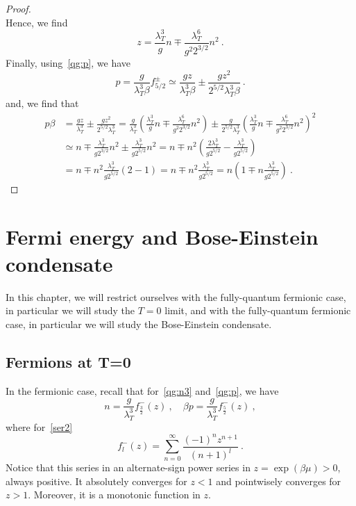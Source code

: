 \begin{proof}
\begin{equation*}
        \end{equation*}
        Hence, we find 
        \begin{equation*}
            z = \frac{\lambda_T^3}{g} n \mp \frac{\lambda_T^6}{g^2 2^{3/2}} n^2 ~.
        \end{equation*}
        Finally, using~\eqref{qg:p}, we have
        \begin{equation*}
            p = \frac{g}{\lambda_T^3 \beta} f^\pm_{5/2} \simeq \frac{gz}{\lambda_T^3\beta} \pm \frac{g z^2}{2^{5/2} \lambda_T^3 \beta} ~.
        \end{equation*}
        and, we find that
        \begin{equation*}
        \begin{aligned}
            p \beta &= \frac{gz}{\lambda_T^3} \pm \frac{g z^2}{2^{5/2} \lambda_T^3}  = \frac{g}{\lambda_T^3} (\frac{\lambda_T^3}{g} n \mp \frac{\lambda_T^6}{g^2 2^{3/2}} n^2) \pm \frac{g}{2^{5/2} \lambda_T^3} (\frac{\lambda_T^3}{g} n \mp \frac{\lambda_T^6}{g^2 2^{3/2}} n^2)^2 \\ & \simeq n \mp \frac{\lambda^3_T}{g 2^{3/2}} n^2 \pm \frac{\lambda^3_T}{g 2^{5/2}} n^2 = n \mp n^2 (\frac{2\lambda^3_T}{g 2^{5/2}} - \frac{\lambda^3_T}{g 2^{5/2}} ) \\ & = n \mp n^2 \frac{\lambda^3_T}{g 2^{5/2}}(2 - 1) = n \mp n^2 \frac{\lambda^3_T}{g 2^{5/2}} = n ( 1 \mp n \frac{\lambda_T^3}{g 2^{5/2}} ) ~.
        \end{aligned}
        \end{equation*}
    \end{proof}

\chapter{Fermi energy and Bose-Einstein condensate}

    In this chapter, we will restrict ourselves with the fully-quantum fermionic case, in particular we will study the $T = 0$ limit, and with the fully-quantum fermionic case, in particular we will study the Bose-Einstein condensate.

\section{Fermions at T=0}

    In the fermionic case, recall that for~\eqref{qg:n3} and~\eqref{qg:p}, we have
    \begin{equation*}
        n = \frac{g}{\lambda_T^3} f_{\frac{3}{2}}^- (z) ~, \quad \beta p = \frac{g}{\lambda_T^3} f_{\frac{5}{2}}^- (z) ~,
    \end{equation*}
    where for~\eqref{ser2}
    \begin{equation*}
        f_l^- (z) = \sum_{n=0}^\infty \frac{(-1)^n z^{n+1}}{(n+1)^l} ~.
    \end{equation*}
    Notice that this series in an alternate-sign power series in $z = \exp(\beta\mu) > 0$, always positive. It absolutely converges for $z < 1$ and pointwisely converges for $z > 1$. Moreover, it is a monotonic function in $z$. 

